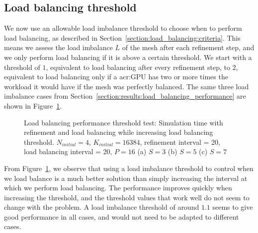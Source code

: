 \subsection{Load balancing threshold}\label{subsection:results:load_balancing_performance:threshold}

We now use an allowable load imbalance threshold to choose when to perform load balancing, as
described in Section~\ref{section:load_balancing:criteria}. This means we assess the load imbalance
\(L\) of the mesh after each refinement step, and we only perform load balancing if it is above a
certain threshold. We start with a threshold of \(1\), equivalent to load balancing after every
refinement step, to \(2\), equivalent to load balancing only if a \acrshort{acr:GPU} has two or more
times the workload it would have if the mesh was perfectly balanced. The same three load imbalance
cases from Section~\ref{section:results:load_balancing_performance} are shown in
Figure~\ref{fig:load_balancing_efficiency_threshold}.

\begin{figure}[H]
    \begin{adjustwidth}{-0.5in}{-0.5in}
    \centering
    \hfill
    \hfill
    \end{adjustwidth}
    \caption{Load balancing performance threshold test: Simulation time with refinement and load balancing while increasing load balancing threshold. \(N_{initial} = 4\), \(K_{initial} = 16384\), refinement interval = 20, load balancing interval = 20, \(P = 16\) (a) \(S = 3\) (b) \(S = 5\) (c) \(S = 7\)}\label{fig:load_balancing_efficiency_threshold}    
\end{figure}

From Figure~\ref{fig:load_balancing_efficiency_threshold}, we observe that using a load imbalance
threshold to control when we load balance is a much better solution than simply increasing the
interval at which we perform load balancing. The performance improves quickly when increasing the
threshold, and the threshold values that work well do not seem to change with the problem. A load
imbalance threshold of around \(1.1\) seems to give good performance in all cases, and would not
need to be adapted to different cases.

